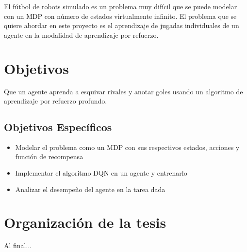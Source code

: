 El fútbol de robots simulado es un problema muy difícil que se puede modelar con un \ac{MDP} con número de estados virtualmente infinito. El problema que se quiere abordar en este proyecto es el aprendizaje de jugadas individuales de un agente en la modalidad de aprendizaje por refuerzo.


\section{Objetivos}

Que un agente aprenda a esquivar rivales y anotar goles usando un algoritmo de aprendizaje por refuerzo profundo.


\subsection{Objetivos Específicos}

\begin{itemize}
\item Modelar el problema como un \ac{MDP} con sus respectivos estados, acciones y función de recompensa
\item Implementar el algoritmo \ac{DQN} en un agente y entrenarlo
\item Analizar el desempeño del agente en la tarea dada
\end{itemize}


\section{Organización de la tesis}

Al final...